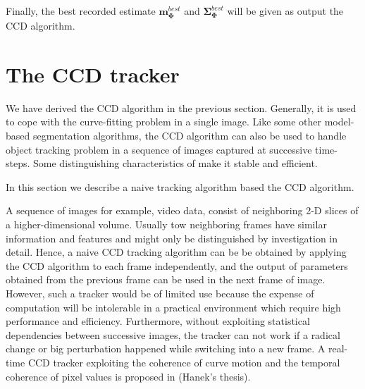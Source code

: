 Finally, the best recorded estimate
$\mathbf{m}_{\mathbf{\Phi}}^{best}$ and
$\mathbf{\Sigma}_{\mathbf{\Phi}}^{best}$ will be given as output the
CCD algorithm.


\section{The CCD tracker}
\label{sec:vg}

We have derived the CCD algorithm in the previous section. Generally,
it is used to cope with the curve-fitting problem in a single
image. Like some other model-based segmentation algorithms, the CCD
algorithm can also be used to handle object tracking problem in a
sequence of images captured at successive time-steps. Some
distinguishing characteristics of make it stable and efficient.

In this section we describe a naive tracking algorithm based the CCD
algorithm.

A sequence of images for example, video data, consist of neighboring 2-D slices of a
higher-dimensional volume. Usually tow neighboring frames have similar
information and features and might only be distinguished by
investigation in detail. Hence, a naive CCD tracking algorithm can be
 be obtained by applying the CCD algorithm to each frame
 independently, and the output of parameters obtained from  the
 previous frame can be used in the next frame of image. However, such
 a tracker would be of limited use because the expense of computation
 will be intolerable in a practical environment which require high
 performance and efficiency. Furthermore, without exploiting
 statistical dependencies between successive images, the tracker can
 not work if a radical change or big perturbation happened while
 switching into a new frame. A real-time CCD tracker exploiting the
 coherence of curve motion and the temporal coherence of pixel values
 is proposed in (Hanek's thesis). 


